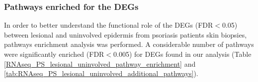 


\subsubsection{Pathways enriched for the DEGs}

In order to better understand the functional role of the DEGs (FDR$<$0.05) between lesional and uninvolved epidermis from psoriasis patients skin biopsies, pathways enrichment analysis was performed. A considerable number of pathways were significantly enriched (FDR$<$0.005) for DEGs found in our analysis (Table \ref{RNAseq_PS_lesional_uninvolved_pathway_enrichment} and \ref{tab:RNAseq_PS_lesional_uninvolved_additional_pathways}). 


